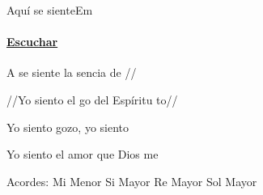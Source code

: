 \documentclass[12pt, spanish]{book}
\begin{document}
    \begin{song}{Aquí se siente}{Em}
    {} %
    {}
    {} %
    {}
        \ifChordBk
            \paragraph{\mbox{}\hfill\protect\href{https://open.spotify.com/intl-es/track/3hnteiTJQJDeVd0cstWdhE}{Escuchar}\mbox{}\hfill}
        \fi


        \begin{SBOpGroup}
            A se siente la sencia de //

            //Yo siento el go del Espíritu to//
        \end{SBOpGroup}

        \begin{SBChorus}
            Yo siento gozo, yo siento 

            Yo siento el amor que Dios me 
        \end{SBChorus}

        \ifChordBk
        \begin{SBOpGroup}
            Acordes:\break
            \upchord{\Em}\qquad Mi Menor \hfill
            \upchord{\B}\qquad Si Mayor \hfill\null\break
            \upchord{\D}\qquad Re Mayor \hfill
            \upchord{\G}\qquad Sol Mayor \hfill\null\break
        \end{SBOpGroup}
        \fi
    \end{song}
\end{document}
